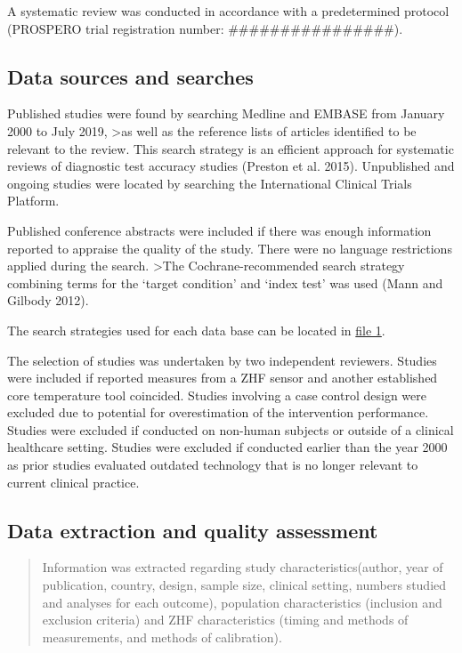 \documentclass[smallextended]{svjour3}       %
\begin{document}
A systematic review was conducted in accordance with a predetermined
protocol (PROSPERO trial registration number:
\#\#\#\#\#\#\#\#\#\#\#\#\#\#\#\#).

\hypertarget{data-sources-and-searches}{%
\subsection{Data sources and searches}\label{data-sources-and-searches}}

Published studies were found by searching Medline and EMBASE from
January 2000 to July 2019, \textgreater{}as well as the reference lists
of articles identified to be relevant to the review. This search
strategy is an efficient approach for systematic reviews of diagnostic
test accuracy studies (Preston et al. 2015). Unpublished and ongoing
studies were located by searching the International Clinical Trials
Platform.

Published conference abstracts were included if there was enough
information reported to appraise the quality of the study. There were no
language restrictions applied during the search. \textgreater{}The
Cochrane-recommended search strategy combining terms for the `target
condition' and `index test' was used (Mann and Gilbody 2012).

The search strategies used for each data base can be located in
\href{}{file 1}.

The selection of studies was undertaken by two independent reviewers.
Studies were included if reported measures from a ZHF sensor and another
established core temperature tool coincided. Studies involving a case
control design were excluded due to potential for overestimation of the
intervention performance. Studies were excluded if conducted on
non-human subjects or outside of a clinical healthcare setting. Studies
were excluded if conducted earlier than the year 2000 as prior studies
evaluated outdated technology that is no longer relevant to current
clinical practice.

\hypertarget{data-extraction-and-quality-assessment}{%
\subsection{Data extraction and quality
assessment}\label{data-extraction-and-quality-assessment}}

\begin{quote}
Information was extracted regarding study characteristics(author, year
of publication, country, design, sample size, clinical setting, numbers
studied and analyses for each outcome), population characteristics
(inclusion and exclusion criteria) and ZHF characteristics (timing and
methods of measurements, and methods of calibration).
\end{quote}
\end{document}
